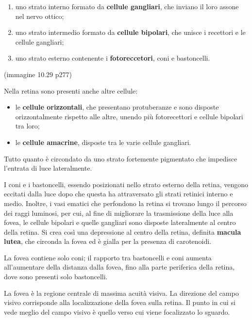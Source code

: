 \documentclass[]{article}
\begin{document}
\begin{enumerate}
\def\labelenumi{\arabic{enumi}.}
\itemsep1pt\parskip0pt
\item
  uno strato interno formato da \textbf{cellule gangliari}, che inviano
  il loro assone nel nervo ottico;
\item
  uno strato intermedio formato da \textbf{cellule bipolari}, che unisce
  i recettori e le cellule gangliari;
\item
  uno strato esterno contenente i \textbf{fotoreccetori}, coni e
  bastoncelli.
\end{enumerate}

(immagine 10.29 p277)

Nella retina sono presenti anche altre cellule:

\begin{itemize}
\itemsep1pt\parskip0pt
\item
  le \textbf{cellule orizzontali}, che presentano protuberanze e sono
  disposte orizzontalmente rispetto alle altre, unendo più fotorecettori
  e cellule bipolari tra loro;
\item
  le \textbf{cellule amacrine}, disposte tra le varie cellule gangliari.
\end{itemize}

Tutto quanto è circondato da uno strato fortemente pigmentato che
impedisce l'entrata di luce lateralmente.

I coni e i bastoncelli, essendo posizionati nello strato esterno della
retina, vengono eccitati dalla luce dopo che questa ha attraversato gli
strati retinici interno e medio. Inoltre, i vasi ematici che perfondono
la retina si trovano lungo il percorso dei raggi luminosi, per cui, al
fine di migliorare la trasmissione della luce alla fovea, le cellule
bipolari e quelle gangliari sono disposte lateralmente al centro della
retina. Si crea così una depressione al centro della retina, definita
\textbf{macula lutea}, che circonda la fovea ed è gialla per la presenza
di carotenoidi.

La fovea contiene solo coni; il rapporto tra bastoncelli e coni aumenta
all'aumentare della distanza dalla fovea, fino alla parte periferica
della retina, dove sono presenti solo bastoncelli.

La fovea è la regione centrale di massima acuità visiva. La direzione
del campo visivo corrisponde alla localizzazione della fovea sulla
retina. Il punto in cui si vede meglio del campo visivo è quello verso
cui viene focalizzato lo sguardo.
\end{document}
